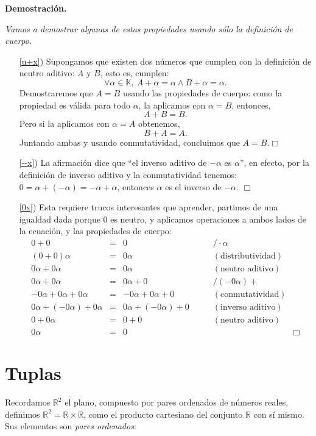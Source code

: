 \documentclass[12pt]{book}
\def\R{\mathbb{R}}
\def\K{\mathbb{K}}
\begin{document}
{\bf Demostración.} {\em
Vamos a demostrar algunas de estas propiedades usando sólo la definición de cuerpo.
\begin{enumerate}
\item[\ref{u+x})] Supongamos que existen dos números que cumplen con la definición de neutro aditivo: $A$ y $B$, esto es, cumplen:
$$ \forall \alpha\in\K,\ A+\alpha=\alpha\wedge B+\alpha=\alpha.$$
Demostraremos que $A=B$ usando las propiedades de cuerpo:
como la propiedad es válida para todo $\alpha$, la aplicamos con $\alpha=B$, entonces,
$$ A+B=B.$$
Pero si la aplicamos con $\alpha=A$ obtenemos,
$$ B+A=A.$$
Juntando ambas y usando conmutatividad, concluimos que $A=B$.\hfill $\Box$
\item[\ref{--x})] La afirmación dice que ``el inverso aditivo de $-\alpha$ es $\alpha$'', en efecto, por la definición de inverso aditivo y la conmutatividad tenemos:\\
$0=\alpha+(-\alpha)=-\alpha+\alpha$, entonces $\alpha$ es el inverso de $-\alpha$. \hfill $\Box$
\item[\ref{0x})] Esta requiere trucos interesantes que aprender, partimos de una igualdad dada porque 0 es neutro, y aplicamos operaciones a ambos lados de la ecuación, y las propiedades de cuerpo:
$$\begin{array} {rcllr}
0+0&=&0 & /\cdot \alpha\\
(0+0)\alpha&=&0\alpha & (\textrm{distributividad})&\\
0\alpha+0\alpha&=&0\alpha & (\textrm{neutro aditivo})&\\
0\alpha+0\alpha&=&0\alpha+0 & /(-0\alpha)+&\\
-0\alpha+0\alpha+0\alpha&=&-0\alpha+0\alpha+0 & (\textrm{conmutatividad})&\\
0\alpha+(-0\alpha)+0\alpha&=&0\alpha+(-0\alpha)+0  \qquad &(\textrm{inverso aditivo})&\\
0+0\alpha&=&0+0  \qquad &(\textrm{neutro aditivo})&\\
0\alpha&=&0&&\Box
\end{array}$$
\end{enumerate}
}

\section{Tuplas}

Recordamos $\R^2$ el plano, compuesto por pares ordenados de números reales, definimos $\R^2=\R\times\R$, como el producto cartesiano del conjunto $\R$ con sí mismo.
Sus elementos son \emph{pares ordenados}:
\end{document}
